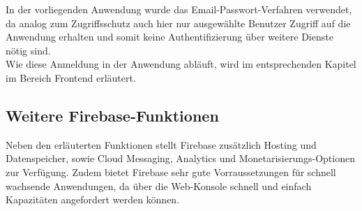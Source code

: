 In der vorliegenden Anwendung wurde das Email-Passwort-Verfahren verwendet, da analog zum Zugriffsschutz auch hier nur ausgewählte Benutzer Zugriff auf die Anwendung erhalten und somit
keine Authentifizierung über weitere Dienste nötig sind.
\\
Wie diese Anmeldung in der Anwendung abläuft, wird im entsprechenden Kapitel im Bereich Frontend erläutert.

\subsection{Weitere Firebase-Funktionen}
Neben den erläuterten Funktionen stellt Firebase zusätzlich Hosting und Datenspeicher, sowie Cloud Messaging, Analytics und Monetarisierungs-Optionen zur Verfügung.
Zudem bietet Firebase sehr gute Vorraussetzungen für schnell wachsende Anwendungen, da über die Web-Konsole schnell und einfach Kapazitäten angefordert werden können.